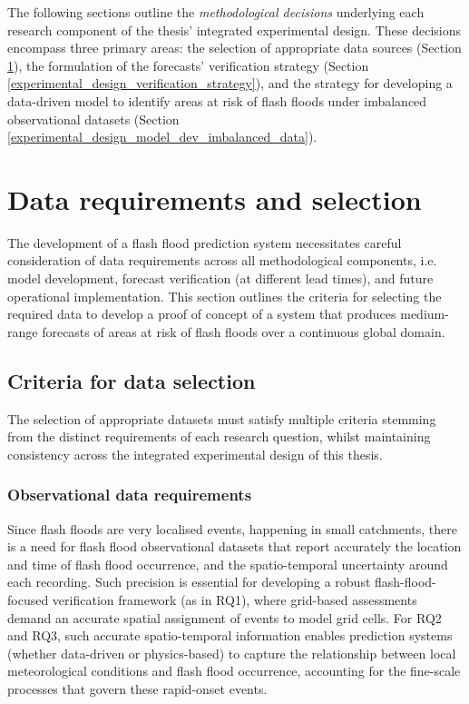 The following sections outline the \textit{methodological decisions} underlying each research component of the thesis' integrated experimental design. These decisions encompass three primary areas: the selection of appropriate data sources (Section \ref{experimental_data_requirements}), the formulation of the forecasts' verification strategy (Section \ref{experimental_design_verification_strategy}), and the strategy for developing a data-driven model to identify areas at risk of flash floods under imbalanced observational datasets (Section \ref{experimental_design_model_dev_imbalanced_data}). 


\section{Data requirements and selection}
\label{experimental_data_requirements}

The development of a flash flood prediction system necessitates careful consideration of data requirements across all methodological components, i.e. model development, forecast verification (at different lead times), and future operational implementation. This section outlines the criteria for selecting the required data to develop a proof of concept of a system that produces medium-range forecasts of areas at risk of flash floods over a continuous global domain. 

\subsection{Criteria for data selection}

The selection of appropriate datasets must satisfy multiple criteria stemming from the distinct requirements of each research question, whilst maintaining consistency across the integrated experimental design of this thesis.

\subsubsection{Observational data requirements}

Since  flash floods are very localised events, happening in small catchments, there is a need for flash flood observational datasets that report accurately the location and time of flash flood occurrence, and the spatio-temporal uncertainty around each recording. Such precision is essential for developing a robust flash-flood-focused verification framework (as in RQ1), where grid-based assessments demand an accurate spatial assignment of events to model grid cells. For RQ2 and RQ3, such accurate spatio-temporal information enables prediction systems (whether data-driven or physics-based) to capture the relationship between local meteorological conditions and flash flood occurrence, accounting for the fine-scale processes that govern these rapid-onset events.

